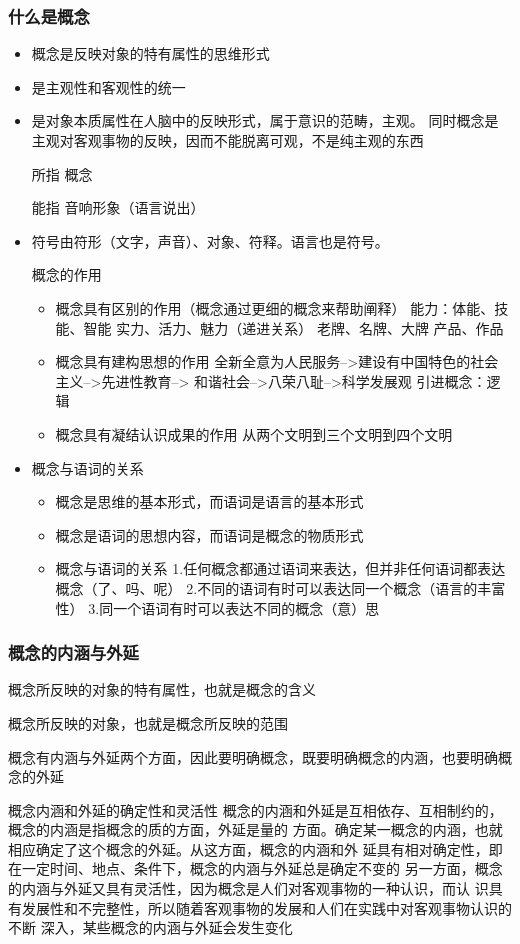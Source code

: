 \documentclass[11pt]{article}
\begin{document}
\subsubsection{什么是概念}
\label{sec-3-1-1}
\begin{itemize}
\item 概念是反映对象的特有属性的思维形式
\item 是主观性和客观性的统一
\item 是对象本质属性在人脑中的反映形式，属于意识的范畴，主观。
同时概念是主观对客观事物的反映，因而不能脱离可观，不是纯主观的东西
\item[{所指}] 概念
\item[{能指}] 音响形象（语言说出）
\item 符号由符形（文字，声音）、对象、符释。语言也是符号。
\item[{概念的作用}] \begin{itemize}
\item 概念具有区别的作用（概念通过更细的概念来帮助阐释）
能力：体能、技能、智能
实力、活力、魅力（递进关系）
老牌、名牌、大牌
产品、作品
\item 概念具有建构思想的作用
全新全意为人民服务-->建设有中国特色的社会主义-->先进性教育-->
和谐社会-->八荣八耻-->科学发展观
引进概念：逻辑
\item 概念具有凝结认识成果的作用
从两个文明到三个文明到四个文明
\end{itemize}
\item 概念与语词的关系
\begin{itemize}
\item 概念是思维的基本形式，而语词是语言的基本形式
\item 概念是语词的思想内容，而语词是概念的物质形式
\item 概念与语词的关系
1.任何概念都通过语词来表达，但并非任何语词都表达概念（了、吗、呢）
2.不同的语词有时可以表达同一个概念（语言的丰富性）
3.同一个语词有时可以表达不同的概念（意）思
\end{itemize}
\end{itemize}
\subsubsection{概念的内涵与外延}
\label{sec-3-1-2}
\begin{description}
\item[{内涵}] 概念所反映的对象的特有属性，也就是概念的含义
\item[{外延}] 概念所反映的对象，也就是概念所反映的范围
\item 概念有内涵与外延两个方面，因此要明确概念，既要明确概念的内涵，也要明确概念的外延
\item 概念内涵和外延的确定性和灵活性
概念的内涵和外延是互相依存、互相制约的，概念的内涵是指概念的质的方面，外延是量的
方面。确定某一概念的内涵，也就相应确定了这个概念的外延。从这方面，概念的内涵和外
延具有相对确定性，即在一定时间、地点、条件下，概念的内涵与外延总是确定不变的
另一方面，概念的内涵与外延又具有灵活性，因为概念是人们对客观事物的一种认识，而认
识具有发展性和不完整性，所以随着客观事物的发展和人们在实践中对客观事物认识的不断
深入，某些概念的内涵与外延会发生变化
\end{description}
\end{document}
